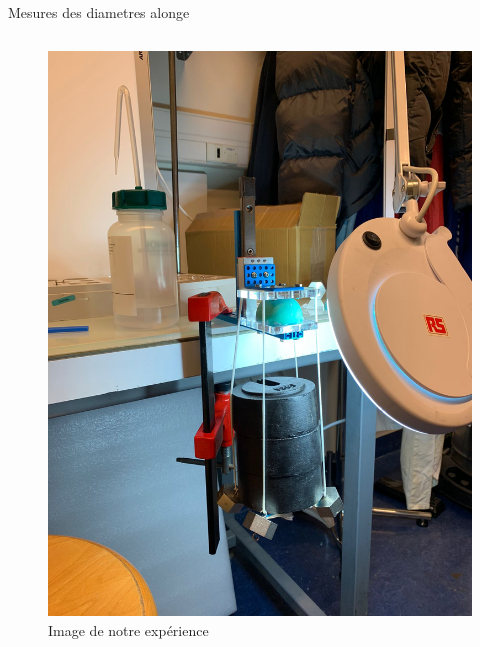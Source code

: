 \begin{frame}{Mesures des diametres alonge}
\begin{columns}
\begin{figure}
            \includegraphics[height=0.65\textheight]{IMG-20221205-WA0028.jpg}
            \caption{Image de notre expérience}
            \label{fig:my_label}
        \end{figure}
        \end{columns}
\end{frame}
